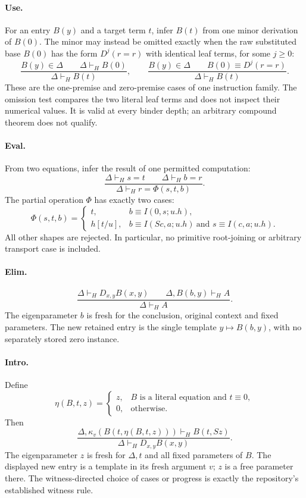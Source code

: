 \paragraph{Use.}
For an entry $B(y)$ and a target term $t$, infer $B(t)$ from one minor
derivation of $B(0)$.  The minor may instead be omitted exactly when the
raw substituted base $B(0)$ has the form $D^j(r=r)$ with identical
leaf terms, for some $j\ge0$:
\[
 \frac{B(y)\in\Delta\qquad\Delta\vdash_H B(0)}
      {\Delta\vdash_H B(t)},
 \qquad
 \frac{B(y)\in\Delta\qquad B(0)\equiv D^j(r=r)}
      {\Delta\vdash_H B(t)}.
 \tag{Use}
\]
These are the one-premise and zero-premise cases of one instruction
family.  The omission test compares the two literal leaf terms and
does not inspect their numerical values.  It is valid at every binder
depth; an arbitrary compound theorem does not qualify.

\paragraph{Eval.}
From two equations, infer the result of one permitted computation:
\[
 \frac{\Delta\vdash_H s=t\qquad\Delta\vdash_H b=r}
      {\Delta\vdash_H r=\Phi(s,t,b)}.
 \tag{Eval}
\]
The partial operation $\Phi$ has exactly two cases:
\[
 \Phi(s,t,b)=
 \begin{cases}
 t,&b\equiv I(0,s;u.h),\\
 h[t/u],&b\equiv I(Sc,a;u.h)\ \text{and }s\equiv I(c,a;u.h).
 \end{cases}
\]
All other shapes are rejected.  In particular, no primitive root-joining
or arbitrary transport case is included.

\paragraph{Elim.}
\[
 \frac{\Delta\vdash_H D_{x,y}B(x,y)\qquad
       \Delta,B(b,y)\vdash_H A}
      {\Delta\vdash_H A}.
 \tag{Elim}
\]
The eigenparameter $b$ is fresh for the conclusion, original context and
fixed parameters.  The new retained entry is the single template
$y\mapsto B(b,y)$, with no separately stored zero instance.

\paragraph{Intro.}
Define
\[
 \eta(B,t,z)=
 \begin{cases}
 z,&B\text{ is a literal equation and }t\equiv0,\\
 0,&\text{otherwise}.
 \end{cases}
\]
Then
\[
 \frac{\Delta,\kappa_v(B(t,\eta(B,t,z)))\vdash_H B(t,Sz)}
      {\Delta\vdash_H D_{x,y}B(x,y)}.
 \tag{Intro}
\]
The eigenparameter $z$ is fresh for $\Delta,t$ and all fixed parameters
of $B$.  The displayed new entry is a template in its fresh argument $v$;
$z$ is a free parameter there.  The witness-directed choice of cases or
progress is exactly the repository's established witness rule.

